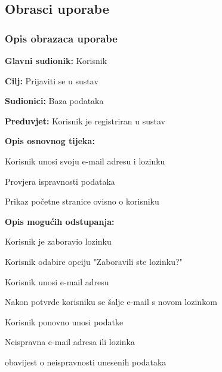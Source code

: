 			\subsection{Obrasci uporabe}
				
				
				\subsubsection{Opis obrazaca uporabe}
					

					\noindent {}
					\begin{packed_item}
	
						\item \textbf{Glavni sudionik: }Korisnik
						\item  \textbf{Cilj: } Prijaviti se u sustav
						\item  \textbf{Sudionici: } Baza podataka
						\item  \textbf{Preduvjet: } Korisnik je registriran u sustav
						\item  \textbf{Opis osnovnog tijeka: }
						
						\item[] \begin{packed_enum}
	
							\item Korisnik unosi svoju e-mail adresu i lozinku
							\item Provjera ispravnosti podataka
							\item Prikaz početne stranice ovisno o korisniku
						\end{packed_enum}
						
						\item  \textbf{Opis mogućih odstupanja:}
						
						\item[] \begin{packed_item}
							\item[1.a] Korisnik je zaboravio lozinku
							\item[] \begin{packed_enum}
								
								\item Korisnik odabire opciju "Zaboravili ste lozinku?"
								\item Korisnik unosi e-mail adresu
								\item Nakon potvrde korisniku se šalje e-mail s novom lozinkom
								\item Korisnik ponovno unosi podatke
								
							\end{packed_enum}
							\item[2.a] Neispravna e-mail adresa ili lozinka
							\item[] \begin{packed_enum}
								
								\item obavijest o neispravnosti unesenih podataka
								
							\end{packed_enum}
							
						\end{packed_item}
					\end{packed_item}
				
